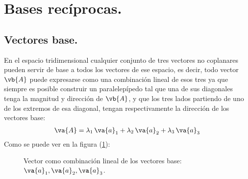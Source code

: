 \section{Bases recíprocas.}
\subsection{Vectores base.}
En el espacio tridimensional cualquier conjunto de tres vectores no coplanares pueden servir de base a todos los vectores de ese espacio, es decir, todo vector $\vb{A}$ puede expresarse como una combinación lineal de esos tres ya que siempre es posible construir un paralelepípedo tal que una de sus diagonales tenga la magnitud y dirección de $\vb{A}$, y que los tres lados partiendo de uno de los extremos de esa diagonal, tengan respectivamente la dirección de los vectores base:
\begin{align*}
\va{A} = \lambda_{1} \, \va{a}_{1} + \lambda_{2} \, \va{a}_{2} + \lambda_{3} \, \va{a}_{3}
\end{align*}
Como se puede ver en la figura (\ref{fig:figura_01}):
\begin{figure}[H]
    \centering
    
    \caption{Vector como combinación lineal de los vectores base: $\va{a}_{1}, \va{a}_{2}, \va{a}_{3}$.}
    \label{fig:figura_01}
\end{figure}
